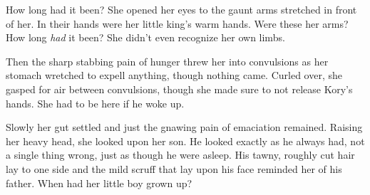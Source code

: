 \documentclass[9pt]{memoir}
\begin{document}
How long had it been? She opened her eyes to the gaunt arms stretched in front of her. In their hands were her little king's warm hands. Were these her arms? How long \textit{had} it been? She didn't even recognize her own limbs.

Then the sharp stabbing pain of hunger threw her into convulsions as her stomach wretched to expell anything, though nothing came. Curled over, she gasped for air between convulsions, though she made sure to not release Kory's hands. She had to be here if he woke up.

Slowly her gut settled and just the gnawing pain of emaciation remained. Raising her heavy head, she looked upon her son. He looked exactly as he always had, not a single thing wrong, just as though he were asleep. His tawny, roughly cut hair lay to one side and the mild scruff that lay upon his face reminded her of his father. When had her little boy grown up?


\backmatter
\end{document}
